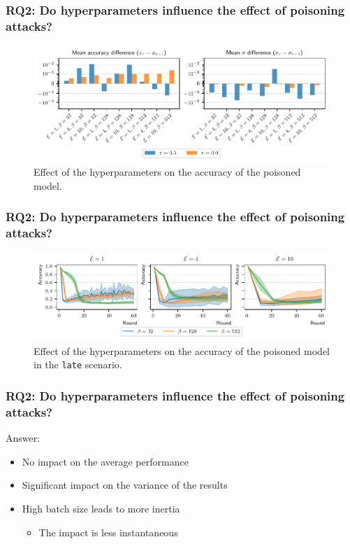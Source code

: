 \documentclass[color,t,presentation,english,aspectratio=169]{beamer}
\begin{document}
\begin{frame}
	\frametitle{RQ2: Do hyperparameters influence the effect of poisoning attacks?}

	\begin{figure}
		\centering
		\includegraphics[width=.8\textwidth]{figures/hyperparams-continous-cicids-small.pdf}
		\caption{Effect of the hyperparameters on the accuracy of the poisoned model.}
	\end{figure}
\end{frame}

\begin{frame}
	\frametitle{RQ2: Do hyperparameters influence the effect of poisoning attacks?}

	\begin{figure}
		\centering
		\includegraphics[width=\textwidth]{figures/hyperparams-late.pdf}
		\caption{Effect of the hyperparameters on the accuracy of the poisoned model in the \texttt{late} scenario.}
	\end{figure}
\end{frame}


\begin{frame}
\frametitle{RQ2: Do hyperparameters influence the effect of poisoning attacks?}

Answer:
\begin{itemize}
	\item No impact on the average performance
	\item Significant impact on the variance of the results
	\item High batch size leads to more inertia
	\begin{itemize}
		\item The impact is less instantaneous
	\end{itemize}
\end{itemize}
\end{frame}
\end{document}
